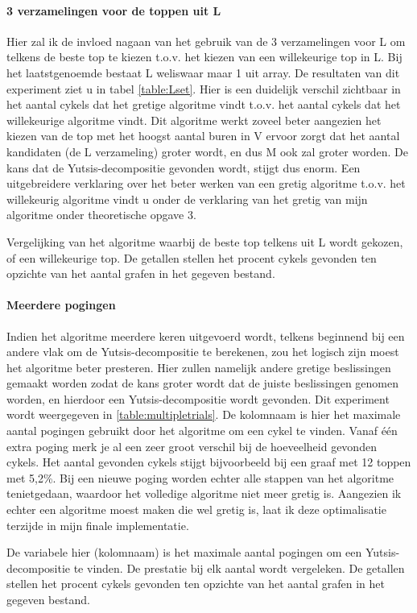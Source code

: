 \documentclass[11pt, a4paper, table]{article}
\theoremstyle{definition}
\theoremstyle{definition}
\theoremstyle{definition}
\begin{document}
\paragraph{3 verzamelingen voor de toppen uit L}
Hier zal ik de invloed nagaan van het gebruik van de 3 verzamelingen voor L om telkens de beste top te kiezen t.o.v. het kiezen van een willekeurige top in L. Bij het laatstgenoemde bestaat L weliswaar maar 1 uit array. De resultaten van dit experiment ziet u in tabel \ref{table:Lset}. Hier is een duidelijk verschil zichtbaar in het aantal cykels dat het gretige algoritme vindt t.o.v. het aantal cykels dat het willekeurige algoritme vindt. Dit algoritme werkt zoveel beter aangezien het kiezen van de top met het hoogst aantal buren in V ervoor zorgt dat het aantal kandidaten (de L verzameling) groter wordt, en dus M ook zal groter worden. De kans dat de Yutsis-decompositie gevonden wordt, stijgt dus enorm. Een uitgebreidere verklaring over het beter werken van een gretig algoritme t.o.v. het willekeurig algoritme vindt u onder de verklaring van het gretig van mijn algoritme onder theoretische opgave 3. 
\begin{table}
	\center
	\caption{Vergelijking van het algoritme waarbij de beste top telkens uit L wordt gekozen, of een willekeurige top. De getallen stellen het procent cykels gevonden ten opzichte van het aantal grafen in het gegeven bestand.
		\label{table:Lset}
	} 
\end{table}

\paragraph{Meerdere pogingen}
Indien het algoritme meerdere keren uitgevoerd wordt, telkens beginnend bij een andere vlak om de Yutsis-decompositie te berekenen, zou het logisch zijn moest het algoritme beter presteren. Hier zullen namelijk andere gretige beslissingen gemaakt worden zodat de kans groter wordt dat de juiste beslissingen genomen worden, en hierdoor een Yutsis-decompositie wordt gevonden.  Dit experiment wordt weergegeven in \ref{table:multipletrials}. 
De kolomnaam is hier het maximale aantal pogingen gebruikt door het algoritme om een cykel te vinden. Vanaf \'{e}\'{e}n extra poging merk je al een zeer groot verschil bij de hoeveelheid gevonden cykels. Het aantal gevonden cykels stijgt bijvoorbeeld bij een graaf met 12 toppen met 5,2\%. Bij een nieuwe poging worden echter alle stappen van het algoritme tenietgedaan, waardoor het volledige algoritme niet meer gretig is. Aangezien ik echter een algoritme moest maken die wel gretig is, laat ik deze optimalisatie terzijde in mijn finale implementatie. 
\begin{table}
	\center
	\caption{De variabele hier (kolomnaam) is het maximale aantal pogingen om een Yutsis-decompositie te vinden. De prestatie bij elk aantal wordt vergeleken. De getallen stellen het procent cykels gevonden ten opzichte van het aantal grafen in het gegeven bestand.
		\label{table:multipletrials}
	} 
\end{table}
\end{document}
